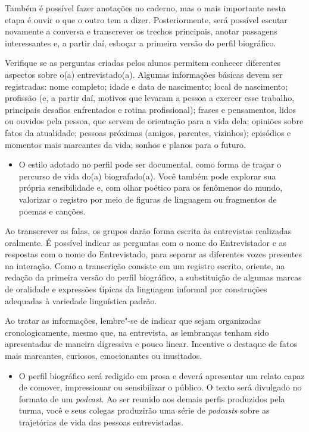 \documentclass[11pt]{extarticle}
\begin{document}
Também é possível fazer anotações no caderno, mas o mais importante
nesta etapa é ouvir o que o outro tem a dizer. Posteriormente, será
possível escutar novamente a conversa e transcrever os trechos
principais, anotar passagens interessantes e, a partir daí, esboçar a
primeira versão do perfil biográfico.

Verifique se as perguntas criadas pelos alunos permitem conhecer
diferentes aspectos sobre o(a) entrevistado(a). Algumas informações
básicas devem ser registradas: nome completo; idade e data de
nascimento; local de nascimento; profissão (e, a partir daí, motivos que
levaram a pessoa a exercer esse trabalho, principais desafios
enfrentados e rotina profissional); frases e pensamentos, lidos ou
ouvidos pela pessoa, que servem de orientação para a vida dela; opiniões
sobre fatos da atualidade; pessoas próximas (amigos, parentes,
vizinhos); episódios e momentos mais marcantes da vida; sonhos e planos
para o futuro.

\begin{itemize}
\item
  O estilo adotado no perfil pode ser documental, como forma de traçar o
  percurso de vida do(a) biografado(a). Você também pode explorar sua
  própria sensibilidade e, com olhar poético para os fenômenos do mundo,
  valorizar o registro por meio de figuras de linguagem ou fragmentos de
  poemas e canções.
\end{itemize}

Ao transcrever as falas, os grupos darão forma escrita às entrevistas
realizadas oralmente. É possível indicar as perguntas com o nome do
Entrevistador e as respostas com o nome do Entrevistado, para separar as
diferentes vozes presentes na interação. Como a transcrição consiste em
um registro escrito, oriente, na redação da primeira versão do perfil
biográfico, a substituição de algumas marcas de oralidade e expressões
típicas da linguagem informal por construções adequadas à variedade
linguística padrão.

Ao tratar as informações, lembre"-se de indicar que sejam organizadas
cronologicamente, mesmo que, na entrevista, as lembranças tenham sido
apresentadas de maneira digressiva e pouco linear. Incentive o destaque
de fatos mais marcantes, curiosos, emocionantes ou inusitados.

\begin{itemize}
\item
  O perfil biográfico será redigido em prosa e deverá apresentar um
  relato capaz de comover, impressionar ou sensibilizar o público. O
  texto será divulgado no formato de um \emph{podcast}. Ao ser reunido
  aos demais perfis produzidos pela turma, você e seus colegas
  produzirão uma série de \emph{podcasts} sobre as trajetórias de vida
  das pessoas entrevistadas.
\end{itemize}
\end{document}
